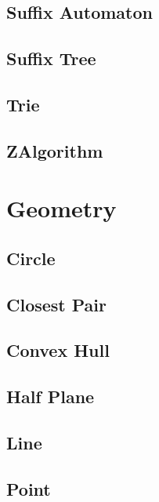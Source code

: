 \subsection{Suffix Automaton}
\raggedbottom
\hrulefill
\subsection{Suffix Tree}
\raggedbottom
\hrulefill
\subsection{Trie}
\raggedbottom
\hrulefill
\subsection{ZAlgorithm}
\raggedbottom
\hrulefill
\newpage

\section{Geometry}
\subsection{Circle}
\raggedbottom
\hrulefill
\subsection{Closest Pair}
\raggedbottom
\hrulefill
\subsection{Convex Hull}
\raggedbottom
\hrulefill
\subsection{Half Plane}
\raggedbottom
\hrulefill
\subsection{Line}
\raggedbottom
\hrulefill
\subsection{Point}
\raggedbottom
\hrulefill
